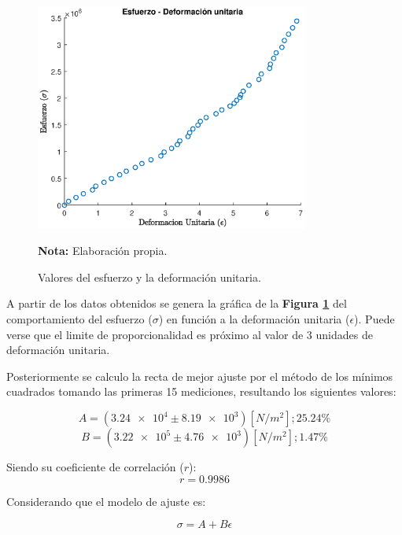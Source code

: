 \documentclass[letter,11pt]{article}
\newcommand{\source}[1]{\vspace{-11pt} \caption*{\small{\textbf{Nota:} {#1}}}}
\begin{document}
\begin{figure}
\centering
\includegraphics[width=0.80\textwidth]{resources/m1.eps}
\caption{Valores del esfuerzo y la deformación unitaria.}
\label{figura4}
\source{Elaboración propia.}
\end{figure}

A partir de los datos obtenidos se genera la gráfica de la
\textbf{Figura \ref{figura4}} del comportamiento del esfuerzo ($\sigma$) en
función a la deformación unitaria ($\epsilon$). Puede verse que el limite de
proporcionalidad es próximo al valor de 3 unidades de deformación unitaria.

Posteriormente se calculo la recta de mejor ajuste por el método de los mínimos
cuadrados tomando las primeras 15 mediciones, resultando los siguientes valores:

\begin{equation*}
    A = (\num{3.24e4} \pm \num{8.19e3}) [N/m^2]; 25.24\%
\end{equation*}
\begin{equation*}
    B = (\num{3.22e5} \pm \num{4.76e3}) [N/m^2]; 1.47\%
\end{equation*}
\vspace{0.10cm}

Siendo su coeficiente de correlación ($r$):
\begin{equation*}
    r = 0.9986
\end{equation*}
\vspace{0.10cm}

Considerando que el modelo de ajuste es:

\begin{equation*}
    \sigma = A + B \epsilon
\end{equation*}
\vspace{0.10cm}
\end{document}
